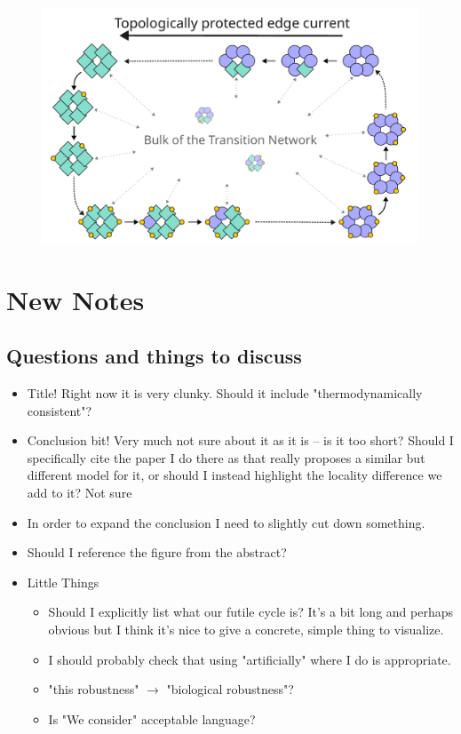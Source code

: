 \documentclass[11pt]{article}
\begin{document}
\vfill
\begin{figure}[H]
	\centering
	\includegraphics[width=\textwidth]{diagram/diagram_circly2.pdf}
\end{figure}

\newpage
\printbibliography

\newpage
\section{New Notes}
\subsection{Questions and things to discuss}
\begin{itemize}
	\item Title! Right now it is very clunky. Should it include "thermodynamically consistent"?
    \item Conclusion bit! Very much not sure about it as it is -- is it too short? Should I specifically cite the paper I do there as that really proposes a similar but different model for it, or should I instead highlight the locality difference we add to it? Not sure
    \item In order to expand the conclusion I need to slightly cut down something.
	\item Should I reference the figure from the abstract?
	\item Little Things \begin{itemize}
		      \item Should I explicitly list what our futile cycle is? It's a bit long and perhaps obvious but I think it's nice to give a concrete, simple thing to visualize.
              \item I should probably check that using "artificially" where I do is appropriate.
              \item "this robustness" $\rightarrow$ "biological robustness"?
              \item Is "We consider" acceptable language?
	      \end{itemize}
\end{itemize}
\end{document}
